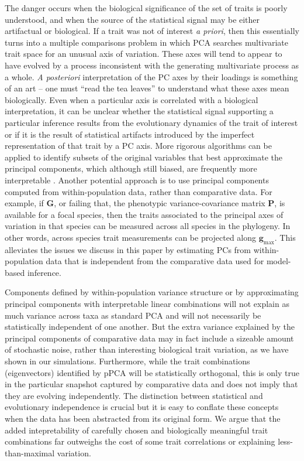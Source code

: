 \documentclass[a4paper,11pt]{article}
\begin{document}
The danger occurs when the biological significance of the set of traits is poorly understood, and when the source of the statistical signal may be either artifactual or biological. If a trait was not of interest \textit{a priori}, then this essentially turns into a multiple comparisons problem in which PCA searches multivariate trait space for an unusual axis of variation. These axes will tend to appear to have evolved by a process inconsistent with the generating multivariate process as a whole. \textit{A posteriori} interpretation of the PC axes by their loadings is something of an art -- one must ``read the tea leaves'' to understand what these axes mean biologically. Even when a particular axis is correlated with a biological interpretation, it can be unclear whether the statistical signal supporting a particular inference results from the evolutionary dynamics of the trait of interest or if it is the result of statistical artifacts introduced by the imperfect representation of that trait by a PC axis. More rigorous algorithms can be applied to identify subsets of the original variables that best approximate the principal components, which although still biased, are frequently more interpretable \citep{Cadima2001,Somers1986, Somers1989, Hausman1982, Vines2000, Jolliffe2002, Zou2006}. Another potential approach is to use principal components computed from within-population data, rather than comparative data. For example, if $\mathbf{G}$, or failing that, the phenotypic variance-covariance matrix $\mathbf{P}$, is available for a focal species, then the traits associated to the principal axes of variation in that species can be measured across all species in the phylogeny. In other words, across species trait measurements can be projected along $\mathbf{g}_{\text{max}}$. This alleviates the issues we discuss in this paper by estimating PCs from within-population data that is independent from the comparative data used for model-based inference.  

Components defined by within-population variance structure or by approximating principal components with interpretable linear combinations will not explain as much variance across taxa as standard PCA and will not necessarily be statistically independent of one another. But the extra variance explained by the principal components of comparative data may in fact include a sizeable amount of stochastic noise, rather than interesting biological trait variation, as we have shown in our simulations. Furthermore, while the trait combinations (eigenvectors) identified by pPCA will be statistically orthogonal, this is only true in the particular snapshot captured by comparative data and does not imply that they are evolving independently. The distinction between statistical and evolutionary independence is crucial \citep{HansenHoule2008} but it is easy to conflate these concepts when the data has been abstracted from its original form.  We argue that the added intepretability of carefully chosen and biologically meaningful trait combinations far outweighs the cost of some trait correlations or explaining less-than-maximal variation.
\end{document}
